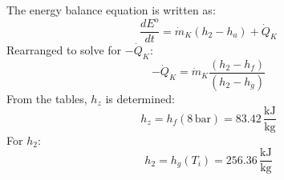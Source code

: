 The energy balance equation is written as:  
\[
\frac{dE^{o}}{dt} = \dot{m}_K (h_2 - h_a) + \dot{Q}_K
\]  
Rearranged to solve for \(-\dot{Q}_K\):  
\[
-\dot{Q}_K = \dot{m}_K \frac{(h_2 - h_f)}{(h_2 - h_g)}
\]  
From the tables, \(h_z\) is determined:  
\[
h_z = h_f(8 \, \text{bar}) = 83.42 \, \frac{\text{kJ}}{\text{kg}}
\]  
For \(h_2\):  
\[
h_2 = h_g(T_i) = 256.36 \, \frac{\text{kJ}}{\text{kg}}
\]